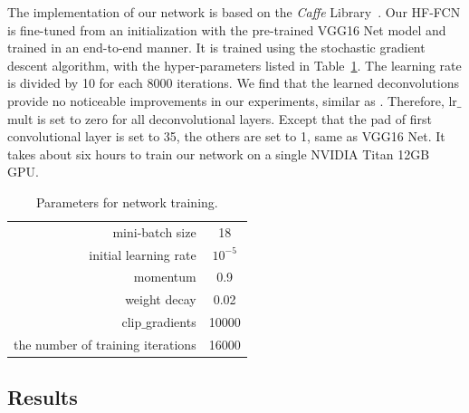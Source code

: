 The implementation of our network is based on the \textit{Caffe}  Library~\cite{Jia2014Caffe}. Our HF-FCN is fine-tuned from an initialization with the pre-trained VGG16 Net model and trained in an end-to-end manner. It is trained using the stochastic gradient descent algorithm, with the hyper-parameters listed in Table~\ref{tab:paramerters}. 
%
The learning rate is divided by 10 for each 8000 iterations.
We find that the learned deconvolutions provide no noticeable improvements in our experiments, similar as \cite{Long2014Fully,Holistically2015}. Therefore, lr$\_$mult is set to zero for all deconvolutional layers.  
%
Except that the pad of first convolutional layer is set to 35, the others are set to 1, same as VGG16 Net. 
%
It takes about six hours to train our network on a single NVIDIA Titan 12GB GPU.
\begin{table}
	\centering
	\caption{Parameters for network training.}
		\begin{tabular}{r|c}
		\hline
		mini-batch size & 18 \\
		initial learning rate & $10^{-5}$\\
		momentum & 0.9\\
		weight decay & 0.02\\
		clip$\_$gradients & 10000 \\
		the number of training iterations & 16000\\		
		\hline
		\end{tabular}
	\label{tab:paramerters} 
\end{table}


\subsection{Results}
 
